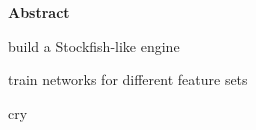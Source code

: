 \thispagestyle{plain}
\begin{center}
\large
\textbf{Abstract}
\end{center}

build a Stockfish-like engine

train networks for different feature sets

cry

\clearpage
